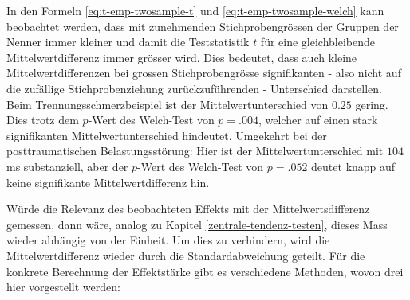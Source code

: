 \documentclass[
]{book}
\theoremstyle{definition}
\theoremstyle{definition}
\theoremstyle{definition}
\theoremstyle{definition}
\theoremstyle{remark}
\begin{document}
In den Formeln \eqref{eq:t-emp-twosample-t} und \eqref{eq:t-emp-twosample-welch} kann beobachtet werden, dass mit zunehmenden Stichprobengrössen der Gruppen der Nenner immer kleiner und damit die Teststatistik \(t\) für eine gleichbleibende Mittelwertdifferenz immer grösser wird. Dies bedeutet, dass auch kleine Mittelwertdifferenzen bei grossen Stichprobengrösse signifikanten - also nicht auf die zufällige Stichprobenziehung zurückzuführenden - Unterschied darstellen. Beim Trennungsschmerzbeispiel ist der Mittelwertunterschied von \(0.25\) gering. Dies trotz dem \(p\)-Wert des Welch-Test von \(p=.004\), welcher auf einen stark signifikanten Mittelwertunterschied hindeutet. Umgekehrt bei der posttraumatischen Belastungsstörung: Hier ist der Mittelwertunterschied mit \(104\) ms substanziell, aber der \(p\)-Wert des Welch-Test von \(p=.052\) deutet knapp auf keine signifikante Mittelwertdifferenz hin.

Würde die Relevanz des beobachteten Effekts mit der Mittelwertsdifferenz gemessen, dann wäre, analog zu Kapitel \ref{zentrale-tendenz-testen}, dieses Mass wieder abhängig von der Einheit. Um dies zu verhindern, wird die Mittelwertdifferenz wieder durch die Standardabweichung geteilt. Für die konkrete Berechnung der Effektstärke gibt es verschiedene Methoden, wovon drei hier vorgestellt werden:
\end{document}
